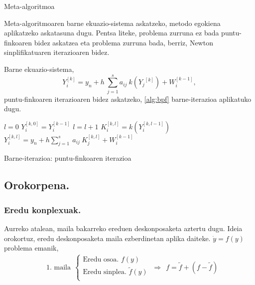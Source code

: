 \begin{algorithm}[H]
 \caption{Meta-algoritmoa}
 \label{alg:metalg}
\end{algorithm}

Meta-algoritmoaren barne ekuazio-sistema askatzeko, metodo egokiena aplikatzeko askatasuna dugu. Pentsa liteke,  problema zurruna ez bada puntu-finkoaren bidez askatzea eta problema zurruna bada, berriz,  Newton sinplifikatuaren iterazioaren bidez.

Barne ekuazio-sistema,
\begin{equation*}
 Y_i^{[k]}=y_n+h\  \sum^s_{j=1}{a_{ij}\ k({Y_j}^{[k]})+W^{[k-1]}_i},
\end{equation*}
puntu-finkoaren iterazioaren bidez askatzeko, \ref{alg:bpf} barne-iterazioa aplikatuko dugu. 

\begin{algorithm}[H]
 \BlankLine
  $l=0$\;
  $Y_{i}^{[k,0]}=Y_{i}^{[k-1]}$\;
  {
   \BlankLine
   $l=l+1$\;  
   \BlankLine
   $K_{i}^{[k,l]}=k(Y_{i}^{[k,l-1]})$\;
   $Y_{i}^{[k,l]}=y_{n} + h \sum\limits_{j=1}^{s} \ a_{ij} \ K_{j}^{[k,l]}  +  W_{i}^{[k-1]} $\;
  }
 \caption{Barne-iterazioa: puntu-finkoaren iterazioa}
 \label{alg:bpf}
\end{algorithm}

\subsection*{Orokorpena.}

\subsubsection*{Eredu konplexuak.}
Aurreko atalean, maila bakarreko ereduen deskonposaketa aztertu dugu. Ideia orokortuz, eredu deskonposaketa maila ezberdinetan aplika daiteke.  $\dot{y} =f(y)$ problema emanik, 
\begin{align*}
&\mbox{1. maila} \ \
\left \{ \begin{array}{c}
  \mbox{Eredu osoa.   } f(y) \\[.25cm]
  \mbox{Eredu sinplea.    } \tilde{f}(y)  \\
\end{array} \right.
\ \Rightarrow \ \
f =\tilde{f}+(f-\tilde{f})  
\end{align*}

